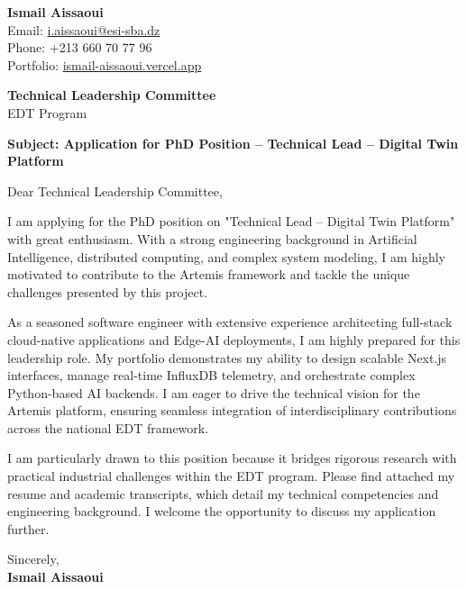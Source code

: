 \documentclass[11pt,a4paper]{article}
\begin{document}
\thispagestyle{empty}

\begin{flushright}
\textbf{Ismail Aissaoui} \\
Email: \href{mailto:i.aissaoui@esi-sba.dz}{i.aissaoui@esi-sba.dz} \\
Phone: +213 660 70 77 96 \\
Portfolio: \href{https://ismail-aissaoui.vercel.app}{ismail-aissaoui.vercel.app}
\end{flushright}

\vspace{1em}

\begin{flushleft}
\textbf{Technical Leadership Committee} \\
EDT Program
\end{flushleft}

\vspace{1em}
\noindent\textbf{Subject: Application for PhD Position -- Technical Lead – Digital Twin Platform}
\vspace{1em}

\noindent Dear Technical Leadership Committee,

\vspace{1em}
\noindent
I am applying for the PhD position on "Technical Lead – Digital Twin Platform" with great enthusiasm. With a strong engineering background in Artificial Intelligence, distributed computing, and complex system modeling, I am highly motivated to contribute to the Artemis framework and tackle the unique challenges presented by this project.

\vspace{0.5em}
\noindent
As a seasoned software engineer with extensive experience architecting full-stack cloud-native applications and Edge-AI deployments, I am highly prepared for this leadership role. My portfolio demonstrates my ability to design scalable Next.js interfaces, manage real-time InfluxDB telemetry, and orchestrate complex Python-based AI backends. I am eager to drive the technical vision for the Artemis platform, ensuring seamless integration of interdisciplinary contributions across the national EDT framework.

\vspace{0.5em}
\noindent
I am particularly drawn to this position because it bridges rigorous research with practical industrial challenges within the EDT program. Please find attached my resume and academic transcripts, which detail my technical competencies and engineering background. I welcome the opportunity to discuss my application further.

\vspace{1.5em}
\noindent
Sincerely, \\[0.5em]
\textbf{Ismail Aissaoui}
\end{document}
